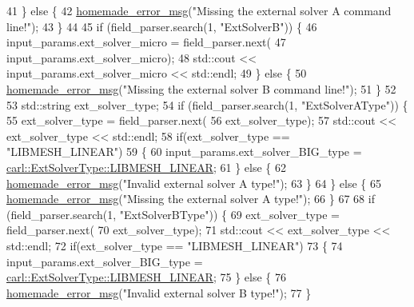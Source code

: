 \begin{DoxyCode}
41     \} \textcolor{keywordflow}{else} \{
42         \hyperlink{common__header_8h_a05d65d26b911668ac90085745dca71f6}{homemade\_error\_msg}(\textcolor{stringliteral}{"Missing the external solver A command line!"});
43     \}
44 
45     \textcolor{keywordflow}{if} (field\_parser.search(1, \textcolor{stringliteral}{"ExtSolverB"})) \{
46         input\_params.ext\_solver\_micro = field\_parser.next(
47                 input\_params.ext\_solver\_micro);
48         std::cout << input\_params.ext\_solver\_micro << std::endl;
49     \} \textcolor{keywordflow}{else} \{
50         \hyperlink{common__header_8h_a05d65d26b911668ac90085745dca71f6}{homemade\_error\_msg}(\textcolor{stringliteral}{"Missing the external solver B command line!"});
51     \}
52 
53     std::string ext\_solver\_type;
54     \textcolor{keywordflow}{if} (field\_parser.search(1, \textcolor{stringliteral}{"ExtSolverAType"})) \{
55         ext\_solver\_type = field\_parser.next(
56                 ext\_solver\_type);
57         std::cout << ext\_solver\_type << std::endl;
58         \textcolor{keywordflow}{if}(ext\_solver\_type == \textcolor{stringliteral}{"LIBMESH\_LINEAR"})
59         \{
60             input\_params.ext\_solver\_BIG\_type = 
      \hyperlink{namespacecarl_a384c8e69965cba9e6e52667c8cefff08a47a0d1839c47dee4ea3610e710d7abaa}{carl::ExtSolverType::LIBMESH\_LINEAR};
61         \} \textcolor{keywordflow}{else} \{ 
62             \hyperlink{common__header_8h_a05d65d26b911668ac90085745dca71f6}{homemade\_error\_msg}(\textcolor{stringliteral}{"Invalid external solver A type!"});
63         \}
64     \} \textcolor{keywordflow}{else} \{
65         \hyperlink{common__header_8h_a05d65d26b911668ac90085745dca71f6}{homemade\_error\_msg}(\textcolor{stringliteral}{"Missing the external solver A type!"});
66     \}
67 
68     \textcolor{keywordflow}{if} (field\_parser.search(1, \textcolor{stringliteral}{"ExtSolverBType"})) \{
69         ext\_solver\_type = field\_parser.next(
70                 ext\_solver\_type);
71         std::cout << ext\_solver\_type << std::endl;
72         \textcolor{keywordflow}{if}(ext\_solver\_type == \textcolor{stringliteral}{"LIBMESH\_LINEAR"})
73         \{
74             input\_params.ext\_solver\_BIG\_type = 
      \hyperlink{namespacecarl_a384c8e69965cba9e6e52667c8cefff08a47a0d1839c47dee4ea3610e710d7abaa}{carl::ExtSolverType::LIBMESH\_LINEAR};
75         \} \textcolor{keywordflow}{else} \{ 
76             \hyperlink{common__header_8h_a05d65d26b911668ac90085745dca71f6}{homemade\_error\_msg}(\textcolor{stringliteral}{"Invalid external solver B type!"});
77         \}

\end{DoxyCode}
